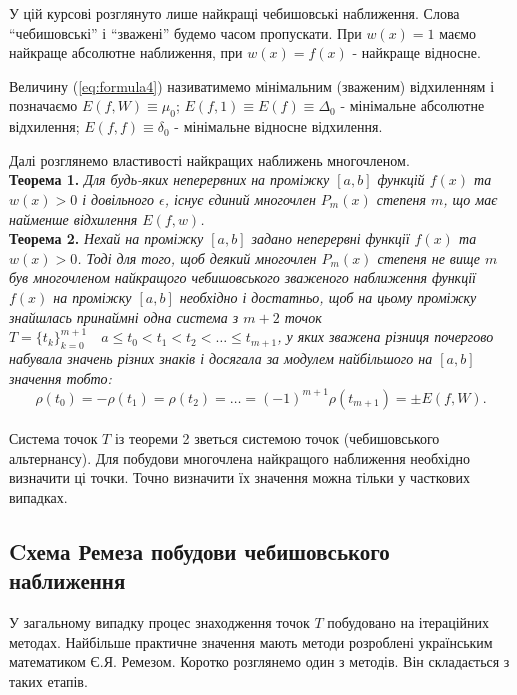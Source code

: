\documentclass[ukrainian,14pt]{extarticle}
\def\ab{[a,b]}
\begin{document}
У цій курсові розглянуто лише найкращі чебишовські наближення. Слова ``чебишовські'' і ``зважені'' будемо часом пропускати. При $w(x) = 1$ маємо найкраще абсолютне наближення, при $w(x) = f(x)$ - найкраще відносне.

Величину (\ref{eq:formula4}) називатимемо мінімальним (зваженим) відхиленням і позначаємо $E(f,W)\equiv\mu_0$; $E(f,1) \equiv E(f) \equiv \Delta_0$ - мінімальне абсолютне відхилення; $E(f,f) \equiv \delta_0$ - мінімальне відносне відхилення.

Далі розглянемо властивості найкращих наближень многочленом.\\

\noindent
\textbf{Теорема 1.}\textit{
Для будь-яких неперервних на проміжку $[a,b]$ функцій $f(x)$ та $w(x) > 0$ і довільного $\epsilon$, існує єдиний многочлен $P_m(x)$ степеня $m$, що має найменше відхилення $E(f,w)$.}\\

\noindent
\textbf{Теорема 2.}\textit{
Нехай на проміжку $[a,b]$ задано неперервні функції $f(x)$ та $w(x) > 0$.
Тоді для того, щоб деякий многочлен $P_m(x)$ степеня не вище $m$ був многочленом найкращого чебишовського зваженого наближення функції $f(x)$ на проміжку $\ab$ необхідно і достатньо, щоб на цьому проміжку знайшлась принаймні одна система з $m+2$ точок \\ $T=\{t_k\}_{k=0}^{m+1} \quad a \leq t_0 < t_1 < t_2 < \ldots \leq t_{m+1}$, у яких зважена різниця  почергово набувала значень різних знаків і досягала за модулем найбільшого на $\ab$ значення тобто:
}
\begin{equation}\label{eq:formula5}
\rho(t_0) = -\rho(t_1) = \rho(t_2) = \ldots = (-1)^{m+1}\rho(t_{m+1}) = \pm E(f,W).
\end{equation}\\


Система точок $T$ із теореми 2 зветься системою точок (чебишовського альтернансу). Для побудови многочлена найкращого наближення  необхідно визначити ці точки. Точно визначити їх значення можна тільки у часткових випадках. 

\subsection{Cхема Ремеза побудови чебишовського наближення}

У загальному випадку процес знаходження точок $T$ побудовано на ітераційних методах. Найбільше практичне значення мають методи розроблені українським математиком Є.Я. Ремезом. Коротко розглянемо один з методів. Він складається з таких етапів.
\end{document}
